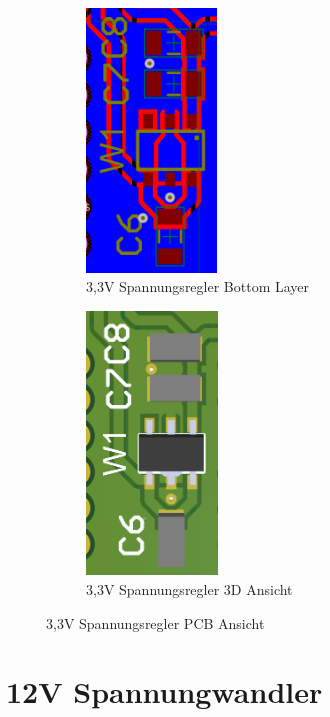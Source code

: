 \begin{inhalt}
\begin{figure}[H] 
  \centering

  \begin{subfigure}[b]{0.48\textwidth}
    \centering
    \includegraphics[height=7cm]{files/Tobias/pics/Schaltungen/PCB/3V3_Spannungregler_PCB.PNG}
    \caption{3,3V Spannungsregler Bottom Layer}
    \label{fig:USB-C_Bottom_layer}
  \end{subfigure}
  \hspace{2mm} %
  \begin{subfigure}[b]{0.48\textwidth}
    \centering
    \includegraphics[height=7cm]{files/Tobias/pics/Schaltungen/PCB/3V3_Spannungsregler_PCB_3D.PNG}
    \caption{3,3V Spannungsregler 3D Ansicht}
    \label{fig:USB-C_3D_Ansicht}
  \end{subfigure}

  \caption{3,3V Spannungsregler PCB Ansicht}
  \label{fig:pcb_layers}
\end{figure}








      \section{12V Spannungwandler}
      

\end{inhalt}
